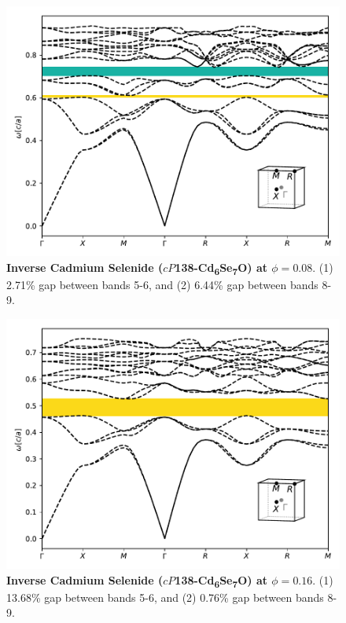 \documentclass[fleqn,amsmath,amssymb,superscriptaddress, reprint,prl]{revtex4-1}
\begin{document}
\begin{figure}
\includegraphics[width=0.9\linewidth]{workspace/1954e09fc49a0bf1abce0da335c8c8f6/images/r=26.pdf}
	\caption{\textbf{Inverse Cadmium Selenide ($cP$138-Cd\textsubscript{6}Se\textsubscript{7}O) at $\phi=0.08$}. (1) 2.71\% gap between bands 5-6, and (2) 6.44\% gap between bands 8-9.}
\end{figure}

\begin{figure}
\includegraphics[width=0.9\linewidth]{workspace/1954e09fc49a0bf1abce0da335c8c8f6/images/r=23.pdf}
	\caption{\textbf{Inverse Cadmium Selenide ($cP$138-Cd\textsubscript{6}Se\textsubscript{7}O) at $\phi=0.16$}. (1) 13.68\% gap between bands 5-6, and (2) 0.76\% gap between bands 8-9.}
\end{figure}
\end{document}
